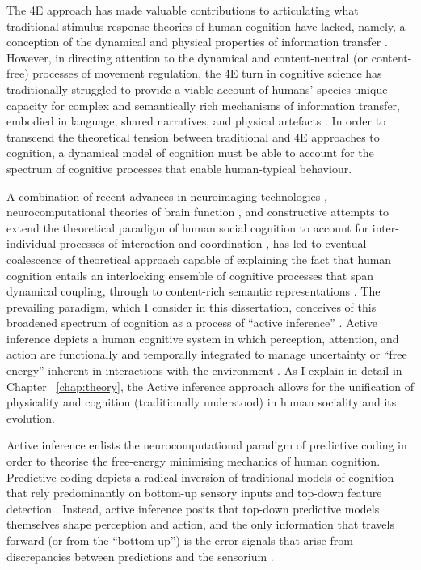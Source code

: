 \begin{CJK}{UTF8}{gbsn}
The 4E approach has made valuable contributions to articulating what traditional stimulus-response theories of human cognition have lacked, namely, a conception of the dynamical and physical properties of information transfer \citep{}.  However, in directing attention to the dynamical and content-neutral (or content-free) processes of movement regulation, the 4E turn in cognitive science has traditionally struggled to provide a viable account of humans' species-unique capacity for complex and semantically rich mechanisms of information transfer, embodied in language, shared narratives, and physical artefacts \citep{Ramstead2016}.  In order to transcend the theoretical tension between traditional and 4E approaches to cognition, a dynamical model of cognition must be able to account for the spectrum of cognitive processes that enable human-typical behaviour.

A combination of recent advances in neuroimaging technologies \citep{Frith2007}, neurocomputational theories of brain function \citep{Friston2010,Frith2010,Yufik2013}, and constructive attempts to extend the theoretical paradigm of human social cognition to account for inter-individual processes of interaction and coordination \citep{Sebanz2006,Dale2014}, has led to eventual coalescence of theoretical approach capable of explaining the fact that human cognition entails an interlocking ensemble of cognitive processes that span dynamical coupling, through to content-rich semantic representations \citep{Roepstorff2011,Ramstead2016}. The prevailing paradigm, which I consider in this dissertation, conceives of this broadened spectrum of cognition as a process of ``active inference'' \citep{Friston2010}.  Active inference depicts a human cognitive system in which perception, attention, and action are functionally and temporally integrated to manage uncertainty or ``free energy'' inherent in interactions with the environment \citep{Clark2013}.  As I explain in detail in Chapter ~\ref{chap:theory}, the Active inference approach allows for the unification of physicality and cognition (traditionally understood) in human sociality and its evolution.

Active inference enlists the neurocomputational paradigm of predictive coding \citep{Rao1999,Clark2013} in order to theorise the free-energy minimising mechanics of human cognition.  Predictive coding depicts a radical inversion of traditional models of cognition that rely predominantly on bottom-up sensory inputs and top-down feature detection \citep{Marr1985}.  Instead, active inference posits that top-down predictive models themselves shape perception and action, and the only information that travels forward (or from the ``bottom-up'') is the error signals that arise from discrepancies between predictions and the sensorium \citep{Clark2015}.


\end{CJK}
